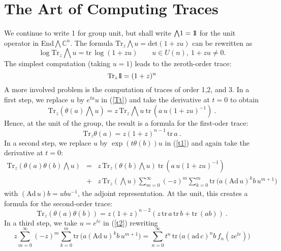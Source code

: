 \documentclass[11pt,a4paper]{article}
\newcommand{\CC}{\mathbb{C}}
\newcommand{\bw}{{\textstyle\bigwedge}}
\def\one{{\mathchoice {\rm 1\mskip-4mu l} {\rm 1\mskip-4mu l}
        {\rm 1\mskip-4.5mu l} {\rm 1\mskip-5mu l}}}
\newcommand{\ah}{\theta(a)}
\newcommand{\bh}{\theta(b)}
\newcommand{\tr}{\mbox{tr}\,}
\newcommand{\Tz}{\mbox{Tr}_z}
\begin{document}
\section{The Art of Computing Traces}

We continue to write 1 for group unit, but shall write $\bw1=\one$ for the
unit operator in End$\bw\CC^n$. The formula $\Tz \bw u=\mbox{det}(1+zu)$ can 
be rewritten as
\begin{equation}
  \label{Tt}
    \log\Tz \bw u=\tr\log(1+zu)\qquad u\in U(n),\ 1+zu\ne0.
\end{equation}
The simplest computation (taking $u=1$) leads to the zeroth-order trace:
\begin{equation}
  \label{zero}
                    \Tz \one=(1+z)^n
\end{equation}
A more involved problem is the computation of traces of order 1,2, and 3.
In a first step, we replace $u$ by $e^{ta}u$ in (\ref{Tt}) and take 
the derivative at $t=0$ to obtain
\begin{equation}
  \label{t1}
        \Tz (\ah\bw u)=z\,\Tz \bw u\ \tr(a\,u(1+zu)^{-1})\ .
\end{equation}
Hence, at the unit of the group, the result is a formula for the first-oder
trace: 
\begin{equation}
  \label{fir}
            \Tz \ah=z(1+z)^{n-1}\,\tr a\ .  
\end{equation}
In a second step, we
replace $u$ by $\exp(t\bh)u$ in (\ref{t1}) and again take the derivative at 
$t=0$:
\begin{eqnarray}
  \Tz (\ah\bh\bw u) &=& z\,\Tz (\bh\bw u)\ \tr(a\,u(1+zu)^{-1})\nonumber\\
                     &+& z\,\Tz (\bw u)\sum_{m=0}^\infty(-z)^m\sum_{k=0}^m
                         \tr\Big(a(\mbox{Ad}\,u)^kb\,u^{m+1}\Big)
                            \label{t2}
\end{eqnarray}
with $(\mbox{Ad}\,u)b=ubu^{-1}$, the adjoint representation. At the unit,
this creates a formula for the second-order trace:
\begin{equation}
  \label{sec}
  \Tz (\ah\bh)=z(1+z)^{n-2}(z\,\tr a\,\tr b+\tr(ab))\ .
\end{equation}
In a third step, we take $u=e^{tc}$ in (\ref{t2}) rewriting
\begin{equation}
  \label{spec}
z\sum_{m=0}^\infty(-z)^m\sum_{k=0}^m\tr\Big(a(\mbox{Ad}\,u)^kb\,u^{m+1}\Big)
=\sum_{n=0}^\infty t^n\,\tr\Big(a(\mbox{ad}\,c)^nb\,f_n(ze^{tc})\Big)
\end{equation}
\end{document}
